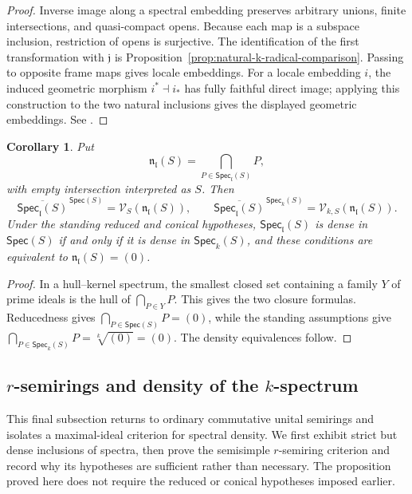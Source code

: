 \documentclass[12pt,leqno]{amsart}
\newcommand{\Spec}{\mathsf{Spec}}
\newcommand{\Speck}{\mathsf{Spec}_{k}}
\newcommand{\Specl}{\mathsf{Spec}_{\mathfrak l}}
\newtheorem{corollary}[theorem]{Corollary}
\theoremstyle{definition}
\numberwithin{equation}{section}
\theoremstyle{remark}
\begin{document}
\begin{proof}
Inverse image along a spectral embedding preserves arbitrary unions, finite intersections, and quasi-compact opens. Because each map is a subspace inclusion, restriction of opens is surjective. The identification of the first transformation with $\mathfrak j$ is Proposition~\ref{prop:natural-k-radical-comparison}. Passing to opposite frame maps gives locale embeddings. For a locale embedding $i$, the induced geometric morphism \(i^*\dashv i_*\) has fully faithful direct image; applying this construction to the two natural inclusions gives the displayed geometric embeddings. See \cite{Johnstone,Che93,Jun17,Man19,Manuell}.
\end{proof}

\begin{corollary}\label{cor:strong-spectrum-density-criterion}
Put
\[
\mathfrak n_{\mathfrak l}(S)
 =\bigcap_{P\in\Specl(S)}P,
\]
with empty intersection interpreted as $S$. Then
\[
\overline{\Specl(S)}^{\,\Spec(S)}
 =\mathcal V_S(\mathfrak n_{\mathfrak l}(S)),
\qquad
\overline{\Specl(S)}^{\,\Speck(S)}
 =\mathcal V_{k,S}(\mathfrak n_{\mathfrak l}(S)).
\]
Under the standing reduced and conical hypotheses, \(\Specl(S)\) is dense in \(\Spec(S)\) if and only if it is dense in \(\Speck(S)\), and these conditions are equivalent to
\(\mathfrak n_{\mathfrak l}(S)=(0)\).
\end{corollary}

\begin{proof}
In a hull--kernel spectrum, the smallest closed set containing a family $Y$ of prime ideals is the hull of \(\bigcap_{P\in Y}P\). This gives the two closure formulas. Reducedness gives
\(\bigcap_{P\in\Spec(S)}P=(0)\), while the standing assumptions give
\(\bigcap_{P\in\Speck(S)}P=\sqrt[k]{(0)}=(0)\). The density equivalences follow.
\end{proof}

\subsection{\texorpdfstring{$r$}{r}-semirings and density of the \texorpdfstring{$k$}{k}-spectrum}\label{subsec:r-semirings}

This final subsection returns to ordinary commutative unital semirings and isolates a maximal-ideal criterion for spectral density. We first exhibit strict but dense inclusions of spectra, then prove the semisimple $r$-semiring criterion and record why its hypotheses are sufficient rather than necessary. The proposition proved here does not require the reduced or conical hypotheses imposed earlier.
\end{document}
